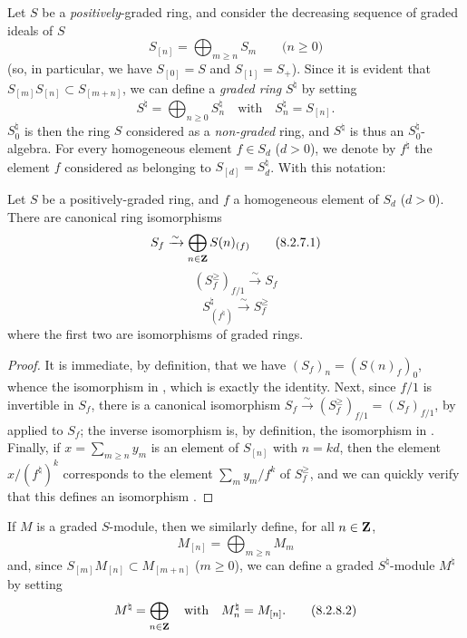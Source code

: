 \begin{env}[8.2.6]
\label{2.8.2.6}
Let $S$ be a \emph{positively}-graded ring, and consider the decreasing sequence of graded ideals of $S$
\[
\label{eq:2.8.2.6.1}
  S_{[n]} = \bigoplus_{m\geq n} S_m
  \qquad\mbox{($n\geq0$)}
\tag{8.2.6.1}
\]
(so, in particular, we have $S_{[0]}=S$ and $S_{[1]}=S_+$).
Since it is evident that $S_{[m]}S_{[n]} \subset S_{[m+n]}$, we can define a \emph{graded ring} $S^\natural$ by setting
\[
\label{eq:2.8.2.6.2}
  S^\natural = \bigoplus_{n\geq0} S_n^\natural
  \quad
  \text{with}
  \quad
  S_n^\natural = S_{[n]}.
\tag{8.2.6.2}
\]
$S_0^\natural$ is then the ring $S$ considered as a \emph{non-graded} ring, and $S^\natural$ is thus an $S_0^\natural$-algebra.
For every homogeneous element $f\in S_d$ ($d>0$), we denote by $f^\natural$ the element $f$ considered as belonging to $S_{[d]} = S_d^\natural$.
With this notation:
\end{env}

\begin{lemma}[8.2.7]
\label{2.8.2.7}
Let $S$ be a positively-graded ring, and $f$ a homogeneous element of $S_d$ ($d>0$).
There are canonical ring isomorphisms
\[
\label{eq:2.8.2.7.1}
  S_f \xrightarrow{\sim} \bigoplus_{n\in\mathbf{Z}} S(n)_{(f)}
\tag{8.2.7.1}
\]
\[
\label{eq:2.8.2.7.2}
  (S_f^\geq)_{f/1} \xrightarrow{\sim} S_f
\tag{8.2.7.2}
\]
\[
\label{eq:2.8.2.7.3}
  S_{(f^\natural)}^\natural \xrightarrow{\sim} S_f^\geq
\tag{8.2.7.3}
\]
where the first two are isomorphisms of graded rings.
\end{lemma}

\begin{proof}
\label{proof-2.8.2.7}
It is immediate, by definition, that we have $(S_f)_n = (S(n)_f)_0$, whence the isomorphism in , which is exactly the identity.
Next, since $f/1$ is invertible in $S_f$, there is a canonical isomorphism $S_f \xrightarrow{\sim} (S_f^\geq)_{f/1} = (S_f)_{f/1}$, by  applied to $S_f$;
the inverse isomorphism is, by definition, the isomorphism in .
Finally, if $x = \sum_{m\geq n}y_m$ is an element of $S_{[n]}$ with $n=kd$, then the element $x/(f^\natural)^k$ corresponds to the element $\sum_m y_m/f^k$ of $S_f^\geq$, and we can quickly verify that this defines an isomorphism .
\end{proof}

\begin{env}[8.2.8]
\label{2.8.2.8}
If $M$ is a graded $S$-module, then we similarly define, for all $n\in\mathbf{Z}$,
\[
\label{eq:2.8.2.8.1}
  M_{[n]} = \bigoplus_{m\geq n} M_m
\tag{8.2.8.1}
\]
and, since $S_{[m]}M_{[n]} \subset M_{[m+n]}$ ($m\geq0$), we can define a graded $S^\natural$-module $M^\natural$ by setting
\[
\label{eq:2.8.2.8.2}
  M^\natural = \bigoplus_{n\in\mathbf{Z}}
  \quad
  \text{with}
  \quad
  M_n^\natural = M_{[n]}.
\tag{8.2.8.2}
\]
\end{env}

